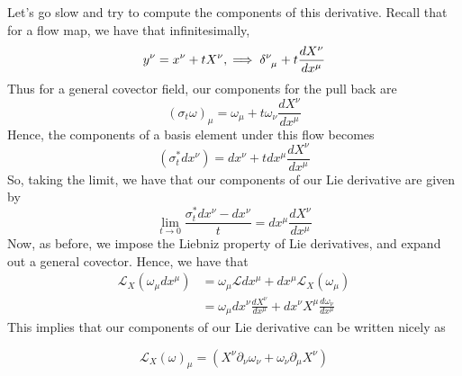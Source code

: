 Let's go slow and try to compute 
the components of this derivative. 
Recall that for a flow map, we have that infinitesimally, 
\[
y^\nu  = x^\nu  + t X^\nu , \implies \delta \indices{^\nu _\mu  } + t \frac{dX^\nu }{dx^\mu  }	  
\] Thus for a general covector field, our components for the pull back 
are 
\[
( \sigma_t \omega )_\mu  = \omega_\mu  + t \omega_\nu \frac{dX^\nu }{dx^\mu  }
\] Hence, the components of a basis element under this flow becomes 
\[
( \sigma_t^* dx^\nu )  = dx^ \nu  + t dx^\mu  \frac{dX^\nu  }{dx^\mu  }
\] So, taking the limit, we have that our components of our 
Lie derivative are given by 
\[
\lim_{t \to 0  } \frac{\sigma^*_t dx^\nu   - dx^\nu  }{ t }  = dx^\mu  \frac{dX^\nu }{dx^\mu  }		 
\] Now, as before, we impose the 
Liebniz property of Lie derivatives, and expand out a general covector. 
Hence, we have that 
\begin{align*}
\mathcal{L}_X( \omega_\mu  dx^\mu  ) &= \omega_\mu  \mathcal{L}dx^\mu  + dx^\mu  \mathcal{L}_X( \omega_\mu  )  \\
 &= \omega_\mu  dx^ \nu  \frac{dX^\nu  }{dx^\mu  } + dx^ \nu  X^\mu   \frac{d \omega_\nu }{dx^ \mu  }
\end{align*} This implies that 
our components of our Lie derivative can be written nicely as 


\[
\mathcal{L }_X( \omega )_\mu   = ( X^\nu \partial_\nu \omega _\nu + \omega _\nu \partial_\mu X^\nu ) 
\]  
